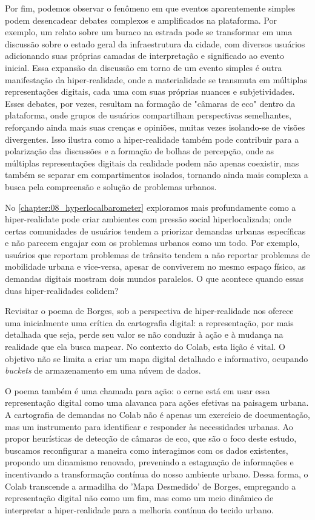 Por fim, podemos observar o fenômeno em que eventos aparentemente simples podem desencadear debates complexos e amplificados na plataforma. Por exemplo, um relato sobre um buraco na estrada pode se transformar em uma discussão sobre o estado geral da infraestrutura da cidade, com diversos usuários adicionando suas próprias camadas de interpretação e significado ao evento inicial. Essa expansão da discussão em torno de um evento simples é outra manifestação da hiper-realidade, onde a materialidade se transmuta em múltiplas representações digitais, cada uma com suas próprias nuances e subjetividades. Esses debates, por vezes, resultam na formação de "câmaras de eco" dentro da plataforma, onde grupos de usuários compartilham perspectivas semelhantes, reforçando ainda mais suas crenças e opiniões, muitas vezes isolando-se de visões divergentes. Isso ilustra como a hiper-realidade também pode contribuir para a polarização das discussões e a formação de bolhas de percepção, onde as múltiplas representações digitais da realidade podem não apenas coexistir, mas também se separar em compartimentos isolados, tornando ainda mais complexa a busca pela compreensão e solução de problemas urbanos.

No \autoref{chapter:08_hyperlocalbarometer} exploramos mais profundamente como a hiper-realidate pode criar ambientes com pressão social hiperlocalizada; onde certas comunidades de usuários tendem a priorizar demandas urbanas específicas e não parecem engajar com os problemas urbanos como um todo. Por exemplo, usuários que reportam problemas de trânsito tendem a não reportar problemas de mobilidade urbana e vice-versa, apesar de conviverem no mesmo espaço físico, as demandas digitais mostram dois mundos paralelos. O que acontece quando essas duas hiper-realidades colidem?

Revisitar o poema de Borges, sob a perspectiva de hiper-realidade nos oferece uma inicialmente uma crítica da cartografia digital: a representação, por mais detalhada que seja, perde seu valor se não conduzir à ação e à mudança na realidade que ela busca mapear. No contexto do Colab, esta lição é vital. O objetivo não se limita a criar um mapa digital detalhado e informativo, ocupando \textit{buckets} de armazenamento em uma núvem de dados. 

O poema também é uma chamada para ação: o cerne está em usar essa representação digital como uma alavanca para ações efetivas na paisagem urbana. A cartografia de demandas no Colab não é apenas um exercício de documentação, mas um instrumento para identificar e responder às necessidades urbanas. Ao propor heurísticas de detecção de câmaras de eco, que são o foco deste estudo, buscamos reconfigurar a maneira como interagimos com os dados existentes, propondo um dinamismo renovado, prevenindo a estagnação de informações e incentivando a transformação contínua do nosso ambiente urbano. Dessa forma, o Colab transcende a armadilha do 'Mapa Desmedido' de Borges, empregando a representação digital não como um fim, mas como um meio dinâmico de interpretar a hiper-realidade para a melhoria contínua do tecido urbano.

